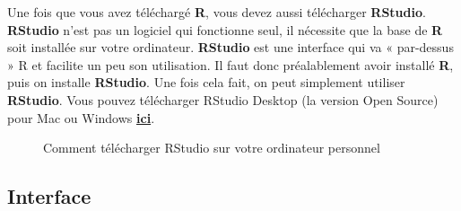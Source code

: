 \documentclass[10.5pt,a4paper]{article}
\begin{document}
  \newpage
 Une fois que vous avez téléchargé \textbf{R}, vous devez aussi télécharger \textbf{RStudio}. \textbf{RStudio} n’est pas un logiciel qui fonctionne seul, il nécessite que la base de \textbf{R} soit installée sur votre ordinateur. \textbf{RStudio} est une interface qui va « par-dessus » R et facilite un peu son utilisation. Il faut donc préalablement avoir installé \textbf{R}, puis on installe \textbf{RStudio}. Une fois cela fait, on peut simplement utiliser \textbf{RStudio}. Vous pouvez télécharger RStudio Desktop (la version Open Source) pour Mac ou Windows \href{https://www.rstudio.com/products/rstudio/download/#download}{\textbf{ici}}.
  
  \begin{figure}[H]
  \centering
  \caption{Comment télécharger RStudio sur votre ordinateur personnel}
  \label{home}
\end{figure}

\subsection{Interface}
\end{document}
